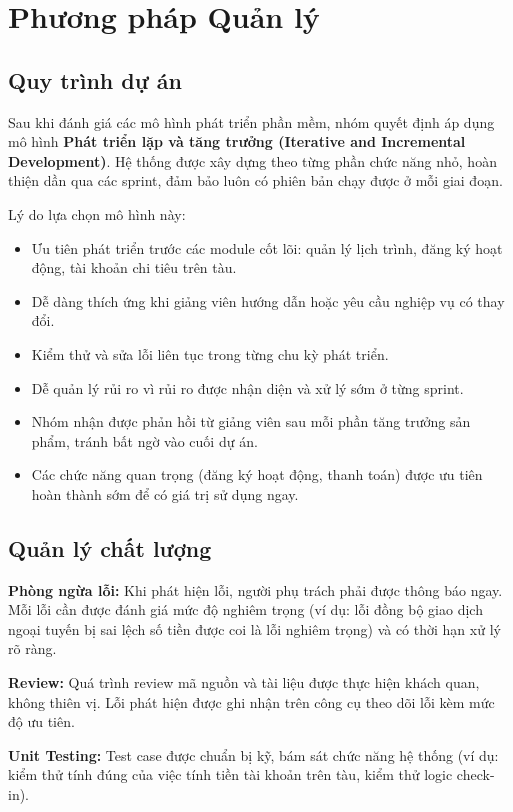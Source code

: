 \section{Phương pháp Quản lý}
\subsection{Quy trình dự án}
Sau khi đánh giá các mô hình phát triển phần mềm, nhóm quyết định áp dụng mô hình \textbf{Phát triển lặp và tăng trưởng (Iterative and Incremental Development)}. Hệ thống được xây dựng theo từng phần chức năng nhỏ, hoàn thiện dần qua các sprint, đảm bảo luôn có phiên bản chạy được ở mỗi giai đoạn.

Lý do lựa chọn mô hình này:
\begin{itemize}
    \item Ưu tiên phát triển trước các module cốt lõi: quản lý lịch trình, đăng ký hoạt động, tài khoản chi tiêu trên tàu.
    \item Dễ dàng thích ứng khi giảng viên hướng dẫn hoặc yêu cầu nghiệp vụ có thay đổi.
    \item Kiểm thử và sửa lỗi liên tục trong từng chu kỳ phát triển.
    \item Dễ quản lý rủi ro vì rủi ro được nhận diện và xử lý sớm ở từng sprint.
    \item Nhóm nhận được phản hồi từ giảng viên sau mỗi phần tăng trưởng sản phẩm, tránh bất ngờ vào cuối dự án.
    \item Các chức năng quan trọng (đăng ký hoạt động, thanh toán) được ưu tiên hoàn thành sớm để có giá trị sử dụng ngay.
\end{itemize}

\subsection{Quản lý chất lượng}
\textbf{Phòng ngừa lỗi:} Khi phát hiện lỗi, người phụ trách phải được thông báo ngay. Mỗi lỗi cần được đánh giá mức độ nghiêm trọng (ví dụ: lỗi đồng bộ giao dịch ngoại tuyến bị sai lệch số tiền được coi là lỗi nghiêm trọng) và có thời hạn xử lý rõ ràng.

\textbf{Review:} Quá trình review mã nguồn và tài liệu được thực hiện khách quan, không thiên vị. Lỗi phát hiện được ghi nhận trên công cụ theo dõi lỗi kèm mức độ ưu tiên.

\textbf{Unit Testing:} Test case được chuẩn bị kỹ, bám sát chức năng hệ thống (ví dụ: kiểm thử tính đúng của việc tính tiền tài khoản trên tàu, kiểm thử logic check-in).

